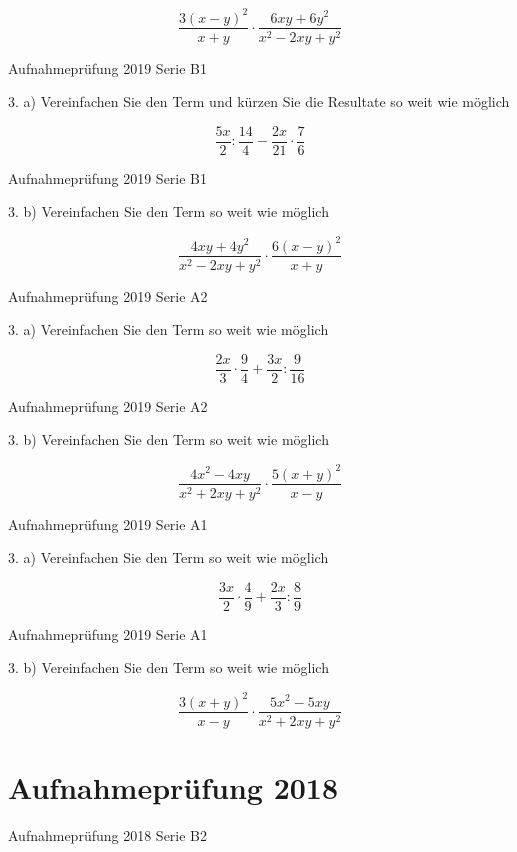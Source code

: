 {$$\frac{3(x-y)^2}{x+y} \cdot{} \frac{6xy+6y^2}{x^2-2xy+y^2}$$

Aufnahmeprüfung 2019 Serie B1

3. a) Vereinfachen Sie den Term und kürzen Sie die Resultate so weit wie möglich

$$\frac{5x}{2} : \frac{14}{4} - \frac{2x}{21} \cdot{} \frac{7}{6}$$

Aufnahmeprüfung 2019 Serie B1

3. b) Vereinfachen Sie den Term so weit wie möglich

$$\frac{4xy+4y^2}{x^2-2xy+y^2} \cdot{} \frac{6(x-y)^2}{x+y}$$

Aufnahmeprüfung 2019 Serie A2

3. a) Vereinfachen Sie den Term so weit wie möglich

$$\frac{2x}{3} \cdot{} \frac{9}{4} + \frac{3x}{2} : \frac{9}{16}$$

Aufnahmeprüfung 2019 Serie A2

3. b) Vereinfachen Sie den Term so weit wie möglich

$$\frac{4x^2-4xy}{x^2+2xy+y^2} \cdot{} \frac{5(x+y)^2}{x-y}$$

Aufnahmeprüfung 2019 Serie A1

3. a) Vereinfachen Sie den Term so weit wie möglich

$$\frac{3x}2 \cdot{} \frac49 + \frac{2x}3 : \frac89$$

Aufnahmeprüfung 2019 Serie A1

3. b) Vereinfachen Sie den Term so weit wie möglich

$$\frac{3(x+y)^2}{x-y} \cdot{} \frac{5x^2-5xy}{x^2+2xy+y^2}$$

\section*{Aufnahmeprüfung 2018}
Aufnahmeprüfung 2018 Serie B2

}
